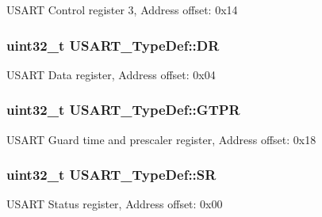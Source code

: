 U\-S\-A\-R\-T Control register 3, Address offset\-: 0x14 \hypertarget{struct_u_s_a_r_t___type_def_a1db25b74d47af33dc4f4fe2177fc5da0}{
\subsubsection[{D\-R}]{ uint32\-\_\-t U\-S\-A\-R\-T\-\_\-\-Type\-Def\-::\-D\-R}}\label{struct_u_s_a_r_t___type_def_a1db25b74d47af33dc4f4fe2177fc5da0}
U\-S\-A\-R\-T Data register, Address offset\-: 0x04 \hypertarget{struct_u_s_a_r_t___type_def_ae23acff49b4ff96fd29093e80fc7d72e}{
\subsubsection[{G\-T\-P\-R}]{ uint32\-\_\-t U\-S\-A\-R\-T\-\_\-\-Type\-Def\-::\-G\-T\-P\-R}}\label{struct_u_s_a_r_t___type_def_ae23acff49b4ff96fd29093e80fc7d72e}
U\-S\-A\-R\-T Guard time and prescaler register, Address offset\-: 0x18 \hypertarget{struct_u_s_a_r_t___type_def_a706005f59139b9ff8ee5755677e12bc7}{
\subsubsection[{S\-R}]{ uint32\-\_\-t U\-S\-A\-R\-T\-\_\-\-Type\-Def\-::\-S\-R}}\label{struct_u_s_a_r_t___type_def_a706005f59139b9ff8ee5755677e12bc7}
U\-S\-A\-R\-T Status register, Address offset\-: 0x00 

